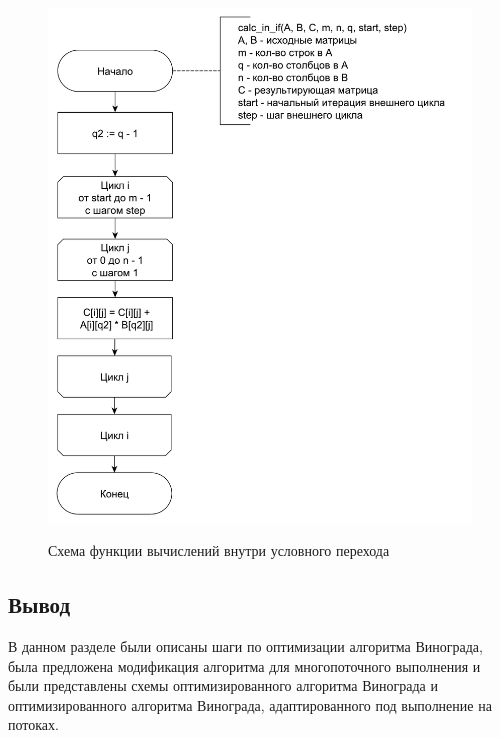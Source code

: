 \documentclass[a4paper,14pt]{article}
\begin{document}
	    
	    	    \begin{figure}[h!]
	    	\begin{center}
	    		{\includegraphics[scale = 0.5]{schema05.pdf}}
	    		\caption{Схема функции вычислений внутри условного перехода}
	    		\label{fig:schema_in_if}
	    	\end{center}
	    \end{figure}
	    
	\newpage
	\mbox{}
	\newpage
	\mbox{}
	\newpage
	\mbox{}
	\newpage
	\mbox{}
	\newpage
	    
	    
	\subsection*{Вывод}
		В данном разделе были описаны шаги по оптимизации алгоритма Винограда, была предложена модификация алгоритма для многопоточного выполнения и были представлены схемы оптимизированного алгоритма Винограда и оптимизированного алгоритма Винограда, адаптированного под выполнение на потоках.
\end{document}
